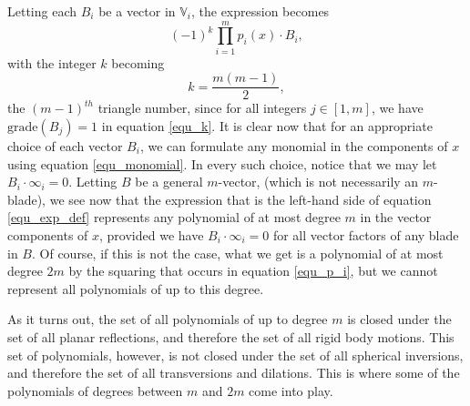 \documentclass{birkjour}
\theoremstyle{definition}
\theoremstyle{remark}
\numberwithin{equation}{section}
\newcommand{\V}{\mathbb{V}}
\newcommand{\nvai}{\infty}
\newcommand{\grade}{\mbox{grade}}
\begin{document}
Letting each $B_i$ be a vector in $\V_i$, the expression becomes
\begin{equation}\label{equ_monomial}
(-1)^k\prod_{i=1}^m p_i(x)\cdot B_i,
\end{equation}
with the integer $k$ becoming
\begin{equation}\label{equ_tri_numb}
k = \frac{m(m-1)}{2},
\end{equation}
the $(m-1)^{th}$ triangle number, since for all integers $j\in[1,m]$, we have $\grade(B_j)=1$ in
equation \eqref{equ_k}.
It is clear now that for an appropriate choice of each vector $B_i$, we can formulate any
monomial in the components of $x$ using equation \eqref{equ_monomial}.  In
every such choice, notice that we may let $B_i\cdot\nvai_i=0$.
Letting $B$ be a general $m$-vector, (which is not necessarily an $m$-blade),
we see now that the expression
that is the left-hand side of equation \eqref{equ_exp_def} represents
any polynomial of at most degree $m$
in the vector components of $x$, provided we have $B_i\cdot\nvai_i=0$
for all vector factors of any blade in $B$.
Of course, if this is not the case, what
we get is a polynomial of at most degree $2m$ by the squaring that
occurs in equation \eqref{equ_p_i}, but we cannot represent all polynomials
of up to this degree.

As it turns out, the set of all polynomials of up to degree $m$ is closed under
the set of all planar reflections, and therefore the set of all
rigid body motions.  This set of polynomials, however, is not closed under the
set of all spherical inversions, and therefore the set of all
transversions and dilations.  This is where some of the polynomials of degrees
between $m$ and $2m$ come into play.
\end{document}
